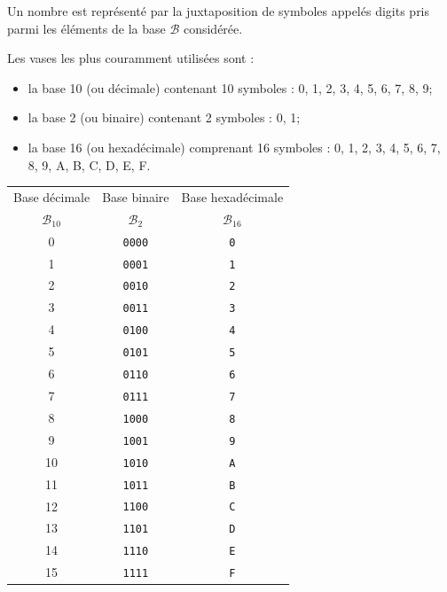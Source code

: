 \documentclass[11pt,oneside]{article}
\begin{document}
\begin{minipage}[c]{.45\linewidth}
Un nombre est représenté par la juxtaposition de symboles appelés digits pris parmi les éléments de la base $\mathcal{B}$ considérée.

Les vases les plus couramment utilisées sont :
\begin{itemize}
\item la base 10 (ou décimale) contenant 10 symboles : 0, 1, 2, 3, 4, 5, 6, 7, 8, 9;
\item la base 2 (ou binaire) contenant 2 symboles : 0, 1;
\item la base 16 (ou hexadécimale) comprenant 16 symboles : 0, 1, 2, 3, 4, 5, 6, 7, 8, 9, A, B, C, D, E, F. 
\end{itemize}
\end{minipage}\hfill
\begin{minipage}[c]{.45\linewidth}
\begin{center}
\begin{tabular}{|c|c|c|}
\hline
Base décimale & 
Base binaire & 
Base hexadécimale \\
$\mathcal{B}_{10}$ & 
$\mathcal{B}_{2}$ & 
$\mathcal{B}_{16}$ \\
\hline \hline
0 & \texttt{0000} & \texttt{0} \\ \hline
1 & \texttt{0001} & \texttt{1} \\ \hline
2 & \texttt{0010} & \texttt{2} \\ \hline
3 & \texttt{0011} & \texttt{3} \\ \hline
4 & \texttt{0100} & \texttt{4} \\ \hline
5 & \texttt{0101} & \texttt{5} \\ \hline
6 & \texttt{0110} & \texttt{6} \\ \hline
7 & \texttt{0111} & \texttt{7} \\ \hline
8 & \texttt{1000} & \texttt{8} \\ \hline
9 & \texttt{1001} & \texttt{9} \\ \hline
10 & \texttt{1010} & \texttt{A} \\ \hline
11 & \texttt{1011} & \texttt{B} \\ \hline
12 & \texttt{1100} & \texttt{C} \\ \hline
13 & \texttt{1101} & \texttt{D} \\ \hline
14 & \texttt{1110} & \texttt{E} \\ \hline
15 & \texttt{1111} & \texttt{F} \\ \hline
\end{tabular}
\end{center}
\end{minipage}
\end{document}
